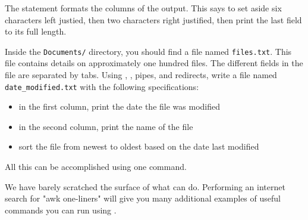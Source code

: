 The statement  formats the columns of the output.
This says to set aside six characters left justied, then two characters right justified, then print the last field to its full length.

\begin{problem}
Inside the \texttt{Documents/} directory, you should find a file named \texttt{files.txt}.
This file contains details on approximately one hundred files.
The different fields in the file are separated by tabs.
Using , , pipes, and redirects, write a file named \texttt{date_modified.txt} with the following specifications:
\begin{itemize}
\item in the first column, print the date the file was modified
\item in the second column, print the name of the file
\item sort the file from newest to oldest based on the date last modified
\end{itemize}
All this can be accomplished using one command.
\end{problem}

We have barely scratched the surface of what  can do.
Performing an internet search for "awk one-liners" will give you many additional examples of useful commands you can run using .

\begin{comment}
\section*{One Final Note}
Though there are multiple Unix shells, one of the most popular is the \emph{bash} shell.
The bash shell is highly customizeable.
In your home directory, you will find a hidden file named \texttt{.bashrc}.
All customization changes are saved in this file.
If you are interested in customizing your shell, you can customize the prompt using the \li{PS1} environment variable.
As you become more and more familiar with the Unix shell, you will come to find there are commands you run over and over again.
You can save commands you use frequently using \li{alias}.
If you would like more information on these and other ways to customize the shell, you can find many quality reference guides and tutorials on the internet.
\end{comment}

